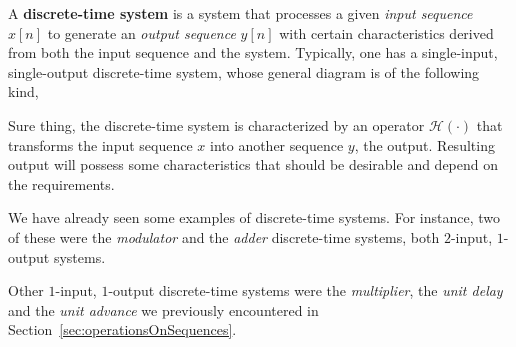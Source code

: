 \documentclass[\documentfontsize, twocolumn]{\classname}
\begin{document}
A \textbf{discrete-time system} is a system that processes a given \emph{input sequence} $x[n]$ to generate an \emph{output sequence} $y[n]$ with certain characteristics derived from both the input sequence and the system. Typically, one has a single-input, single-output discrete-time system, whose general diagram is of the following kind,
\begin{center}
\end{center}
Sure thing, the discrete-time system is characterized by an operator $\mathcal H(\cdot)$ that transforms the input sequence $x$ into another sequence $y$, the output. Resulting output will possess some characteristics that should be desirable and depend on the requirements. 

We have already seen some examples of discrete-time systems. For instance, two of these were the \emph{modulator} and the \emph{adder} discrete-time systems, both $2$-input, $1$-output systems.
\begin{center}
\end{center}
Other $1$-input, $1$-output discrete-time systems were the \emph{multiplier}, the \emph{unit delay} and the \emph{unit advance} we previously encountered in Section~\ref{sec:operationsOnSequences}. 
\end{document}
